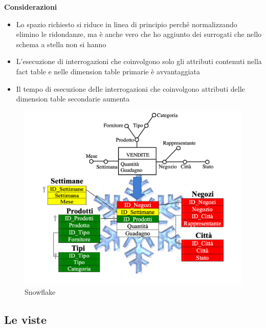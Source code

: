 \textbf{Considerazioni}

\begin{itemize}
	\item
	Lo spazio richiesto si riduce in linea di principio perché normalizzando elimino le ridondanze, ma è anche vero che ho aggiunto dei surrogati che nello schema a stella non si hanno
	\item 
	L’esecuzione di interrogazioni che coinvolgono solo gli attributi contenuti nella fact table e nelle dimension table primarie è avvantaggiata
	\item 
	Il tempo di esecuzione delle interrogazioni che coinvolgono attributi delle dimension table secondarie aumenta
\end{itemize}
\begin{figure}[H]
	\centering
	\includegraphics[width=0.6\linewidth]{img/snowflake}
	\caption{Snowflake}
	\label{fig:snowflake}
\end{figure}

\subsection{Le viste}

	

